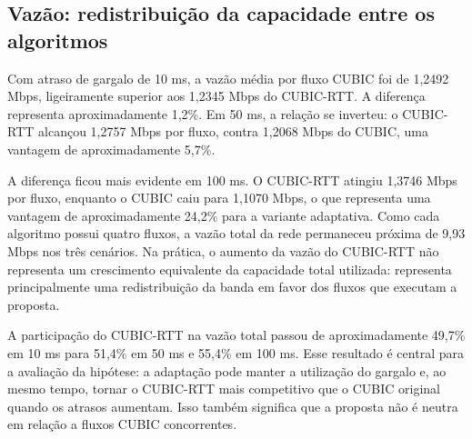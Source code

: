 \begin{table}[htbp]
\centering
\caption{Resultados médios da campanha de coexistência}
\label{tab:coexistencia}
\small
{}
\end{table}

\subsection{Vazão: redistribuição da capacidade entre os algoritmos}

Com atraso de gargalo de 10 ms, a vazão média por fluxo CUBIC foi de 1,2492 Mbps, ligeiramente superior aos 1,2345 Mbps do CUBIC-RTT. A diferença representa aproximadamente 1,2\%. Em 50 ms, a relação se inverteu: o CUBIC-RTT alcançou 1,2757 Mbps por fluxo, contra 1,2068 Mbps do CUBIC, uma vantagem de aproximadamente 5,7\%.

A diferença ficou mais evidente em 100 ms. O CUBIC-RTT atingiu 1,3746 Mbps por fluxo, enquanto o CUBIC caiu para 1,1070 Mbps, o que representa uma vantagem de aproximadamente 24,2\% para a variante adaptativa. Como cada algoritmo possui quatro fluxos, a vazão total da rede permaneceu próxima de 9,93 Mbps nos três cenários. Na prática, o aumento da vazão do CUBIC-RTT não representa um crescimento equivalente da capacidade total utilizada: representa principalmente uma redistribuição da banda em favor dos fluxos que executam a proposta.

A participação do CUBIC-RTT na vazão total passou de aproximadamente 49,7\% em 10 ms para 51,4\% em 50 ms e 55,4\% em 100 ms. Esse resultado é central para a avaliação da hipótese: a adaptação pode manter a utilização do gargalo e, ao mesmo tempo, tornar o CUBIC-RTT mais competitivo que o CUBIC original quando os atrasos aumentam. Isso também significa que a proposta não é neutra em relação a fluxos CUBIC concorrentes.


